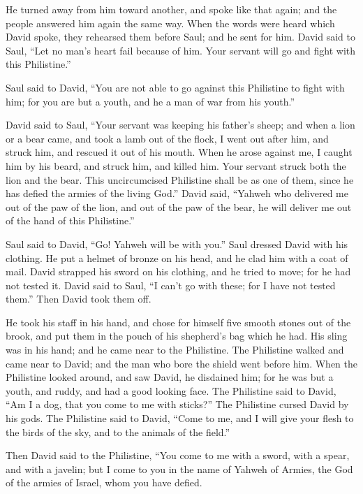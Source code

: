 {He turned away from him toward another, and spoke like that again; and the people answered him again the same way.
When the words were heard which David spoke, they rehearsed them before Saul; and he sent for him.
David said to Saul, “Let no man’s heart fail because of him. Your servant will go and fight with this Philistine.”
\par }{\PP {}Saul said to David, “You are not able to go against this Philistine to fight with him; for you are but a youth, and he a man of war from his youth.”
\par }{\PP {}David said to Saul, “Your servant was keeping his father’s sheep; and when a lion or a bear came, and took a lamb out of the flock,
I went out after him, and struck him, and rescued it out of his mouth. When he arose against me, I caught him by his beard, and struck him, and killed him.
Your servant struck both the lion and the bear. This uncircumcised Philistine shall be as one of them, since he has defied the armies of the living God.”
David said, “Yahweh who delivered me out of the paw of the lion, and out of the paw of the bear, he will deliver me out of the hand of this Philistine.”
\par }{\PP Saul said to David, “Go! Yahweh will be with you.”
Saul dressed David with his clothing. He put a helmet of bronze on his head, and he clad him with a coat of mail.
David strapped his sword on his clothing, and he tried to move; for he had not tested it. David said to Saul, “I can’t go with these; for I have not tested them.” Then David took them off.
\par }{\PP {}He took his staff in his hand, and chose for himself five smooth stones out of the brook, and put them in the pouch of his shepherd’s bag which he had. His sling was in his hand; and he came near to the Philistine.
The Philistine walked and came near to David; and the man who bore the shield went before him.
When the Philistine looked around, and saw David, he disdained him; for he was but a youth, and ruddy, and had a good looking face.
The Philistine said to David, “Am I a dog, that you come to me with sticks?” The Philistine cursed David by his gods.
The Philistine said to David, “Come to me, and I will give your flesh to the birds of the sky, and to the animals of the field.”
\par }{\PP {}Then David said to the Philistine, “You come to me with a sword, with a spear, and with a javelin; but I come to you in the name of Yahweh of Armies, the God of the armies of Israel, whom you have defied.
}
